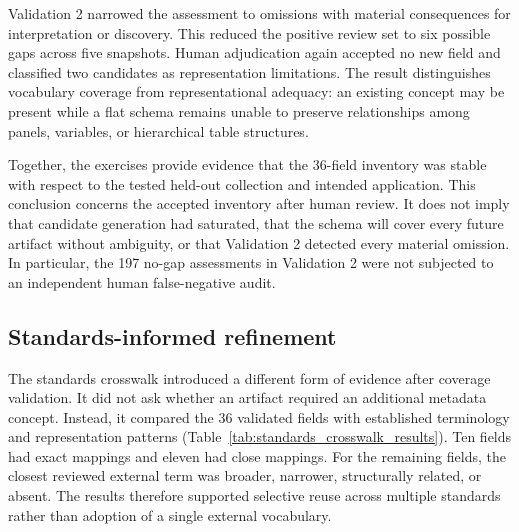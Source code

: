 \documentclass{article}
\begin{document}
Validation 2 narrowed the assessment to omissions with material consequences for interpretation or discovery. This reduced the positive review set to six possible gaps across five snapshots. Human adjudication again accepted no new field and classified two candidates as representation limitations. The result distinguishes vocabulary coverage from representational adequacy: an existing concept may be present while a flat schema remains unable to preserve relationships among panels, variables, or hierarchical table structures.

Together, the exercises provide evidence that the 36-field inventory was stable with respect to the tested held-out collection and intended application. This conclusion concerns the accepted inventory after human review. It does not imply that candidate generation had saturated, that the schema will cover every future artifact without ambiguity, or that Validation 2 detected every material omission. In particular, the 197 no-gap assessments in Validation 2 were not subjected to an independent human false-negative audit.

\subsection{Standards-informed refinement}

The standards crosswalk introduced a different form of evidence after coverage validation. It did not ask whether an artifact required an additional metadata concept. Instead, it compared the 36 validated fields with established terminology and representation patterns (Table~\ref{tab:standards_crosswalk_results}). Ten fields had exact mappings and eleven had close mappings. For the remaining fields, the closest reviewed external term was broader, narrower, structurally related, or absent. The results therefore supported selective reuse across multiple standards rather than adoption of a single external vocabulary.
\end{document}
